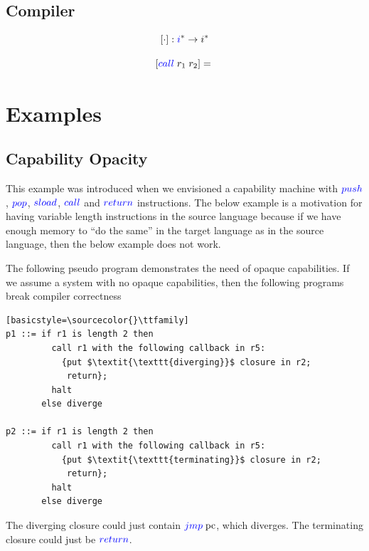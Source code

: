\documentclass[a4paper]{article}
\newcommand{\fun}{\rightarrow}
\newcommand{\sourcecolor}[1]{\color{blue}}
\newcommand{\src}[1]{{\sourcecolor{} #1}}
\newcommand{\targetcolor}[1]{\color{black}}
\newcommand{\trg}[1]{{\targetcolor{} #1}}
\newcommand{\zinstr}[1]{#1}
\newcommand{\oneinstr}[2]{
  \ifthenelse{\equal{#2}{}}
  {\zinstr{#1}}
  {\zinstr{#1} \; #2}
}
\newcommand{\twoinstr}[3]{
  \ifthenelse{\equal{#2#3}{}}
  {\zinstr{#1}}
  {\zinstr{#1} \; #2 \; #3}
}
\newcommand{\sreturn}{\zinstr{\src{return}}}
\newcommand{\sjmp}[1]{\oneinstr{\src{jmp}}{#1}}
\newcommand{\spush}[1]{\oneinstr{\src{push}}{#1}}
\newcommand{\spop}[1]{\oneinstr{\src{pop}}{#1}}
\newcommand{\ssload}[2]{\twoinstr{\src{sload}}{#1}{#2}}
\newcommand{\scall}[2]{\twoinstr{\src{call}}{#1}{#2}}
\newcommand{\pcreg}{\mathrm{pc}}
\newcommand{\comp}[1]{[#1]}
\begin{document}
\subsection{Compiler}
\[
\comp{\cdot} : \src{i}^* \fun \trg{i}^*
\]

\[
  \comp{\scall{r_1}{r_2}} = 
  \begin{array}[t]{l}
  \end{array}
\]

\clearpage
\section{Examples}
\subsection{Capability Opacity}
\label{subsec:capability-opacity}
This example was introduced when we envisioned a capability machine with $\spush{}$, $\spop{}$, $\ssload{}{}$, $\scall{}{}$ and $\sreturn$ instructions. The below example is a motivation for having variable length instructions in the source language because if we have enough memory to ``do the same'' in the target language as in the source language, then the below example does not work.

The following pseudo program demonstrates the need of opaque capabilities. If we assume a system with no opaque capabilities, then the following programs break compiler correctness
\begin{lstlisting}
[basicstyle=\sourcecolor{}\ttfamily] 
p1 ::= if r1 is length 2 then
         call r1 with the following callback in r5:
           {put $\textit{\texttt{diverging}}$ closure in r2;
            return};
         halt
       else diverge

p2 ::= if r1 is length 2 then
         call r1 with the following callback in r5:
           {put $\textit{\texttt{terminating}}$ closure in r2;
            return};
         halt
       else diverge
\end{lstlisting}
The diverging closure could just contain $\sjmp{\pcreg}$, which diverges. The terminating closure could just be $\sreturn$.
\end{document}
